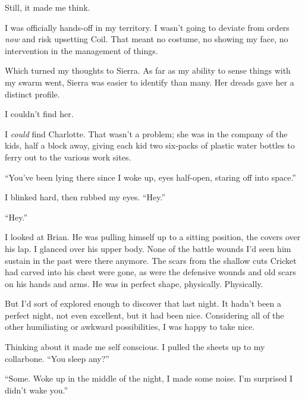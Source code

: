 Still, it made me think.



I was officially hands-off in my territory.  I wasn't going to deviate from orders \emph{now} and risk upsetting Coil.  That meant no costume, no showing my face, no intervention in the management of things.



Which turned my thoughts to Sierra.  As far as my ability to sense things with my swarm went, Sierra was easier to identify than many.  Her dreads gave her a distinct profile.



I couldn't find her.



I \emph{could} find Charlotte.  That wasn't a problem; she was in the company of the kids, half a block away, giving each kid two six-packs of plastic water bottles to ferry out to the various work sites.



``You've been lying there since I woke up, eyes half-open, staring off into space.''



I blinked hard, then rubbed my eyes.  ``Hey.''



``Hey.''



I looked at Brian.  He was pulling himself up to a sitting position, the covers over his lap.  I glanced over his upper body.  None of the battle wounds I'd seen him sustain in the past were there anymore.  The scars from the shallow cuts Cricket had carved into his chest were gone, as were the defensive wounds and old scars on his hands and arms.  He was in perfect shape, physically.  Physically.



But I'd sort of explored enough to discover that last night.  It hadn't been a perfect night, not even excellent, but it had been nice.  Considering all of the other humiliating or awkward possibilities, I was happy to take nice.



Thinking about it made me self conscious.  I pulled the sheets up to my collarbone.  ``You sleep any?''



``Some.  Woke up in the middle of the night, I made some noise.  I'm surprised I didn't wake you.''



